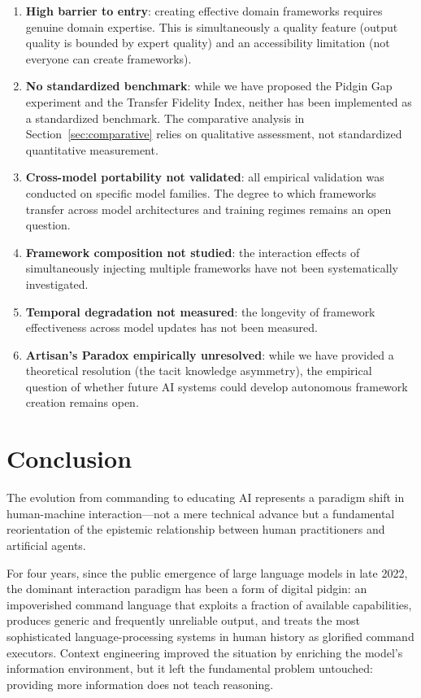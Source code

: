 \documentclass[12pt,a4paper]{article}
\begin{document}
\begin{enumerate}
  \item \textbf{High barrier to entry}: creating effective domain frameworks requires genuine domain expertise. This is simultaneously a quality feature (output quality is bounded by expert quality) and an accessibility limitation (not everyone can create frameworks).

  \item \textbf{No standardized benchmark}: while we have proposed the Pidgin Gap experiment and the Transfer Fidelity Index, neither has been implemented as a standardized benchmark. The comparative analysis in Section~\ref{sec:comparative} relies on qualitative assessment, not standardized quantitative measurement.

  \item \textbf{Cross-model portability not validated}: all empirical validation was conducted on specific model families. The degree to which frameworks transfer across model architectures and training regimes remains an open question.

  \item \textbf{Framework composition not studied}: the interaction effects of simultaneously injecting multiple frameworks have not been systematically investigated.

  \item \textbf{Temporal degradation not measured}: the longevity of framework effectiveness across model updates has not been measured.

  \item \textbf{Artisan's Paradox empirically unresolved}: while we have provided a theoretical resolution (the tacit knowledge asymmetry), the empirical question of whether future AI systems could develop autonomous framework creation remains open.
\end{enumerate}


\section{Conclusion}
\label{sec:conclusion}

The evolution from commanding to educating AI represents a paradigm shift in human-machine interaction---not a mere technical advance but a fundamental reorientation of the epistemic relationship between human practitioners and artificial agents.

For four years, since the public emergence of large language models in late 2022, the dominant interaction paradigm has been a form of digital pidgin: an impoverished command language that exploits a fraction of available capabilities, produces generic and frequently unreliable output, and treats the most sophisticated language-processing systems in human history as glorified command executors. Context engineering improved the situation by enriching the model's information environment, but it left the fundamental problem untouched: providing more information does not teach reasoning.
\end{document}
